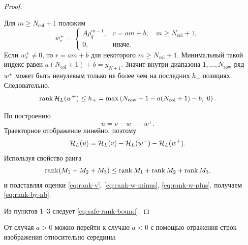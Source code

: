 \begin{proof}
\begin{enumerate}
    Для $m\ge N_{\mathrm{col}}+1$ положим
    \begin{equation}
        w^+_r
        =
        \begin{cases}
            A\rho_q^{m-1}, & r=am+b,\quad m\ge N_{\mathrm{col}}+1,\\
            0, & \text{иначе}.
        \end{cases}
        \label{eq:w-plus}
    \end{equation}
    Если $w^+_r\ne0$, то $r=am+b$ для некоторого
    $m\ge N_{\mathrm{col}}+1$. Минимальный такой индекс равен
    $a(N_{\mathrm{col}}+1)+b=y_{N+1}$. Значит внутри диапазона
    $1,\dots,N_{\mathrm{row}}$ ряд $w^+$ может быть ненулевым только не более
    чем на последних $h_+$ позициях. Следовательно,
    \begin{equation}
        \operatorname{rank}\mathcal H_L(w^+)
        \le
        h_+
        =
        \max\left(
            N_{\mathrm{row}}+1-a(N_{\mathrm{col}}+1)-b,\ 0
        \right).
        \label{eq:rank-w-plus}
    \end{equation}

    По построению
    \begin{equation}
        u=v-w^- -w^+.
        \label{eq:u-v-decomposition}
    \end{equation}
    Траекторное отображение линейно, поэтому
    \begin{equation}
        \mathcal H_L(u)
        =
        \mathcal H_L(v)
        -
        \mathcal H_L(w^-)
        -
        \mathcal H_L(w^+).
        \label{eq:hankel-decomposition}
    \end{equation}
    Используя свойство ранга
    \[
        \operatorname{rank}(M_1+M_2+M_3)
        \le
        \operatorname{rank} M_1+\operatorname{rank} M_2+\operatorname{rank} M_3,
    \]
    и подставляя оценки \eqref{eq:rank-v}, \eqref{eq:rank-w-minus},
    \eqref{eq:rank-w-plus}, получаем \eqref{eq:rank-by-ab}.
\end{enumerate}

Из пунктов 1--3 следует \eqref{eq:safe-rank-bound}.

\end{proof}

От случая $a>0$ можно перейти к случаю $a<0$ с помощью отражения строк изображения относительно середины.

